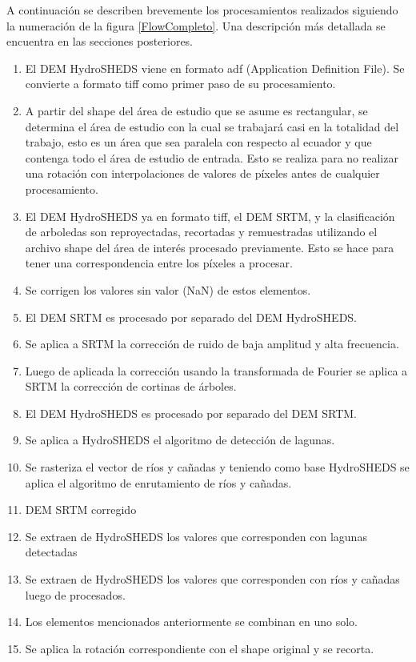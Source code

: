 \documentclass[10pt,a4paper, twoside]{report}
\begin{document}
A continuación se describen brevemente los procesamientos realizados siguiendo la numeración de la figura \ref{FlowCompleto}. Una descripción más detallada se encuentra en las secciones posteriores.

\begin{enumerate}
	\item El DEM HydroSHEDS viene en formato adf (Application Definition File). Se convierte a formato tiff como primer paso de su procesamiento.
	\item A partir del shape del área de estudio que se asume es rectangular, se determina el área de estudio con la cual se trabajará casi en la totalidad del trabajo, esto es un área que sea paralela con respecto al ecuador y que contenga todo el área de estudio de entrada. Esto se realiza para no realizar una rotación con interpolaciones de valores de píxeles antes de cualquier procesamiento.
	\item El DEM HydroSHEDS ya en formato tiff, el DEM SRTM, y la clasificación de arboledas son reproyectadas, recortadas y remuestradas utilizando el archivo shape del área de interés procesado previamente. Esto se hace para tener una correspondencia entre los píxeles a procesar.
	\item Se corrigen los valores sin valor (NaN) de estos elementos.
	\item El DEM SRTM es procesado por separado del DEM HydroSHEDS.
	\item Se aplica a SRTM la corrección de ruido de baja amplitud y alta frecuencia.
	\item Luego de aplicada la corrección usando la transformada de Fourier se aplica a SRTM la corrección de cortinas de árboles.
	\item El DEM HydroSHEDS es procesado por separado del DEM SRTM.
	\item Se aplica a HydroSHEDS el algoritmo de detección de lagunas.
	\item Se rasteriza el vector de ríos y cañadas y teniendo como base HydroSHEDS se aplica el algoritmo de enrutamiento de ríos y cañadas.
	\item DEM SRTM corregido
	\item Se extraen de HydroSHEDS los valores que corresponden con lagunas detectadas
	\item Se extraen de HydroSHEDS los valores que corresponden con ríos y cañadas luego de procesados.
	\item Los elementos mencionados anteriormente se combinan en uno solo.
	\item Se aplica la rotación correspondiente con el shape original y se recorta.	
\end{enumerate}
\end{document}
